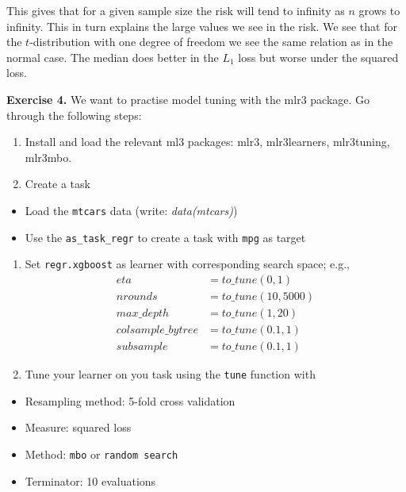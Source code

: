\documentclass[
]{book}
\providecommand{\tightlist}{%
  \setlength{\itemsep}{0pt}\setlength{\parskip}{0pt}}
\begin{document}
This gives that for a given sample size the risk will tend to infinity as \(n\) grows to infinity. This in turn explains the large values we see in the risk. We see that for the \(t\)-distribution with one degree of freedom we see the same relation as in the normal case. The median does better in the \(L_1\) loss but worse under the squared loss.

\textbf{Exercise 4.} We want to practise model tuning with the mlr3 package. Go through the following steps:

\begin{enumerate}
\def\labelenumi{\arabic{enumi}.}
\tightlist
\item
  Install and load the relevant ml3 packages: mlr3, mlr3learners, mlr3tuning, mlr3mbo.
\item
  Create a task
\end{enumerate}

\begin{itemize}
\tightlist
\item
  Load the \texttt{mtcars} data (write: \emph{data(mtcars)})
\item
  Use the \texttt{as\_task\_regr} to create a task with \texttt{mpg} as target
\end{itemize}

\begin{enumerate}
\def\labelenumi{\arabic{enumi}.}
\setcounter{enumi}{2}
\tightlist
\item
  Set \texttt{regr.xgboost} as learner with corresponding search space; e.g.,
  \begin{align*}
  eta &= to\_tune(0, 1)\\
  nrounds &= to\_tune(10, 5000)\\
  max\_depth &= to\_tune(1, 20)\\
  colsample\_bytree &= to\_tune(0.1, 1)\\
  subsample &= to\_tune(0.1, 1)
  \end{align*}
\item
  Tune your learner on you task using the \texttt{tune} function with
\end{enumerate}

\begin{itemize}
\tightlist
\item
  Resampling method: 5-fold cross validation
\item
  Measure: squared loss
\item
  Method: \texttt{mbo} or \texttt{random\ search}
\item
  Terminator: 10 evaluations
\end{itemize}
\end{document}
